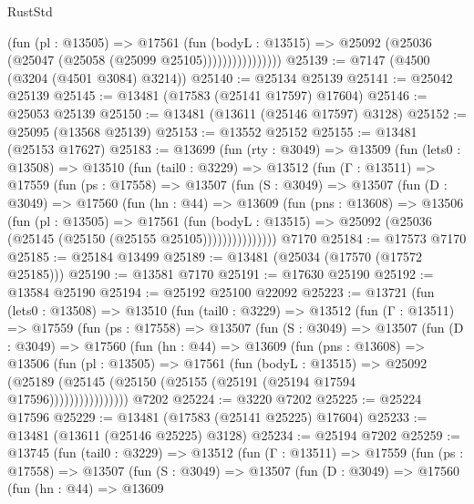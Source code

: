 \begin{lexlean}{RustStd}
\begin{coremodule}
                        (fun (pl : @13505) =>
                        @17561
                          (fun (bodyL : @13515) =>
                          @25092 (@25036 (@25047 (@25058 (@25099 @25105))))))))))))))))
@25139 := @7147 (@4500 (@3204 (@4501 @3084) @3214))
@25140 := @25134 @25139
@25141 := @25042 @25139
@25145 := @13481 (@17583 (@25141 @17597) @17604)
@25146 := @25053 @25139
@25150 := @13481 (@13611 (@25146 @17597) @3128)
@25152 := @25095 (@13568 @25139)
@25153 := @13552 @25152
@25155 := @13481 (@25153 @17627)
@25183 := @13699
    (fun (rty : @3049) =>
    @13509
      (fun (lets0 : @13508) =>
      @13510
        (fun (tail0 : @3229) =>
        @13512
          (fun (Γ : @13511) =>
          @17559
            (fun (ps : @17558) =>
            @13507
              (fun (S : @3049) =>
              @13507
                (fun (D : @3049) =>
                @17560
                  (fun (hn : @44) =>
                  @13609
                    (fun (pns : @13608) =>
                    @13506
                      (fun (pl : @13505) =>
                      @17561
                        (fun (bodyL : @13515) =>
                        @25092 (@25036 (@25145 (@25150 (@25155 @25105)))))))))))))))
    @7170
@25184 := @17573 @7170
@25185 := @25184 @13499
@25189 := @13481 (@25034 (@17570 (@17572 @25185)))
@25190 := @13581 @7170
@25191 := @17630 @25190
@25192 := @13584 @25190
@25194 := @25192 @25100 @22092
@25223 := @13721
    (fun (lets0 : @13508) =>
    @13510
      (fun (tail0 : @3229) =>
      @13512
        (fun (Γ : @13511) =>
        @17559
          (fun (ps : @17558) =>
          @13507
            (fun (S : @3049) =>
            @13507
              (fun (D : @3049) =>
              @17560
                (fun (hn : @44) =>
                @13609
                  (fun (pns : @13608) =>
                  @13506
                    (fun (pl : @13505) =>
                    @17561
                      (fun (bodyL : @13515) =>
                      @25092
                        (@25189
                          (@25145 (@25150 (@25155 (@25191 (@25194 @17594 @17596))))))))))))))))
    @7202
@25224 := @3220 @7202
@25225 := @25224 @17596
@25229 := @13481 (@17583 (@25141 @25225) @17604)
@25233 := @13481 (@13611 (@25146 @25225) @3128)
@25234 := @25194 @7202
@25259 := @13745
    (fun (tail0 : @3229) =>
    @13512
      (fun (Γ : @13511) =>
      @17559
        (fun (ps : @17558) =>
        @13507
          (fun (S : @3049) =>
          @13507
            (fun (D : @3049) =>
            @17560
              (fun (hn : @44) =>
              @13609

\end{coremodule}
\end{lexlean}
